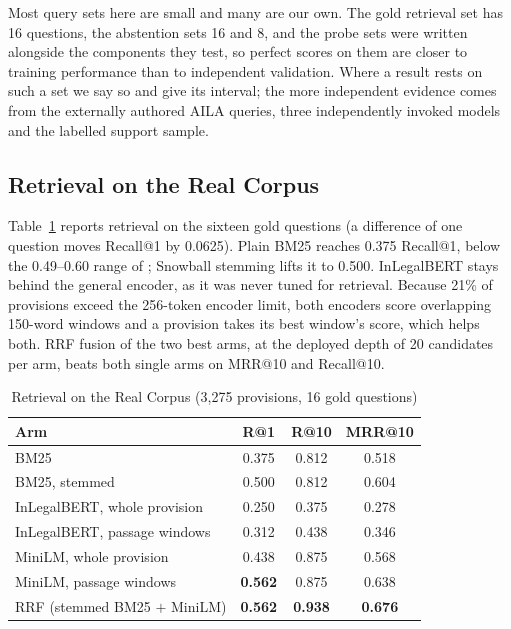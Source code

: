 \documentclass[conference]{IEEEtran}
\begin{document}
Most query sets here are small and many are our own. The gold retrieval set has 16 questions, the abstention sets 16 and 8, and the probe sets were written alongside the components they test, so perfect scores on them are closer to training performance than to independent validation. Where a result rests on such a set we say so and give its interval; the more independent evidence comes from the externally authored AILA queries, three independently invoked models and the labelled support sample.

\subsection{Retrieval on the Real Corpus}
\label{ssec:realcorpus}

Table~\ref{tab:realret} reports retrieval on the sixteen gold questions (a difference of one question moves Recall@1 by 0.0625). Plain BM25 reaches 0.375 Recall@1, below the 0.49--0.60 range of \cite{rustamov2025}; Snowball stemming lifts it to 0.500. InLegalBERT stays behind the general encoder, as it was never tuned for retrieval. Because 21\% of provisions exceed the 256-token encoder limit, both encoders score overlapping 150-word windows and a provision takes its best window's score, which helps both. RRF fusion of the two best arms, at the deployed depth of 20 candidates per arm, beats both single arms on MRR@10 and Recall@10.

\begin{table}[t]
\caption{Retrieval on the Real Corpus (3,275 provisions, 16 gold questions)}
\label{tab:realret}
\centering
\footnotesize
\begin{tabular}{@{}lccc@{}}
\toprule
\textbf{Arm} & \textbf{R@1} & \textbf{R@10} & \textbf{MRR@10} \\
\midrule
BM25                            & 0.375 & 0.812 & 0.518 \\
BM25, stemmed                   & 0.500 & 0.812 & 0.604 \\
InLegalBERT, whole provision    & 0.250 & 0.375 & 0.278 \\
InLegalBERT, passage windows    & 0.312 & 0.438 & 0.346 \\
MiniLM, whole provision         & 0.438 & 0.875 & 0.568 \\
MiniLM, passage windows         & \textbf{0.562} & 0.875 & 0.638 \\
\addlinespace
RRF (stemmed BM25 $+$ MiniLM)   & \textbf{0.562} & \textbf{0.938} & \textbf{0.676} \\
\bottomrule
\end{tabular}
\end{table}
\end{document}
